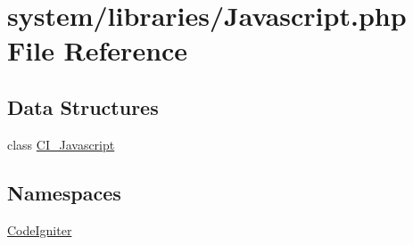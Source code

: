 \hypertarget{_javascript_8php}{\section{system/libraries/\-Javascript.php File Reference}
\label{_javascript_8php}
}
\subsection*{Data Structures}
\begin{DoxyCompactItemize}
\item 
class \hyperlink{class_c_i___javascript}{C\-I\-\_\-\-Javascript}
\end{DoxyCompactItemize}
\subsection*{Namespaces}
\begin{DoxyCompactItemize}
\item 
\hyperlink{namespace_code_igniter}{Code\-Igniter}
\end{DoxyCompactItemize}
